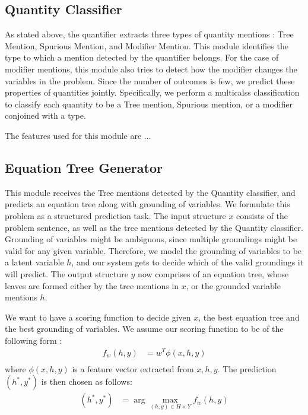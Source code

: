   \subsection{Quantity Classifier}
    As stated above, the quantifier extracts three types of quantity
    mentions : Tree Mention, Spurious Mention, and Modifier
    Mention. This module identifies the type to which a mention
    detected by the quantifier belongs. For the case of modifier
    mentions, this module also tries to detect how the modifier
    changes the variables in the problem. Since the number of outcomes
    is few, we predict these properties of quantities
    jointly. Specifically, we perform a multicalss classification to
    classify each quantity to be a Tree mention, Spurious mention, or
    a modifier conjoined with a type.

    The features used for this module are ...
    
  \subsection{Equation Tree Generator}

    This module receives the Tree mentions detected by the Quantity
    classifier, and predicts an equation tree along with grounding of
    variables. We formulate this problem as a structured prediction
    task.  The input structure $x$ consists of the problem sentence,
    as well as the tree mentions detected by the Quantity
    classifier. Grounding of variables might be ambiguous, since
    multiple groundings might be valid for any given
    variable. Therefore, we model the grounding of variables to be a
    latent variable $h$, and our system gets to decide which of the
    valid groundings it will predict. The output structure $y$ now comprises
    of an equation tree, whose leaves are formed either by the tree mentions
    in $x$, or the grounded variable mentions $h$.

    We want to have a scoring function to decide given $x$, the best
    equation tree and the best grounding of variables. We assume our scoring 
    function to be of the following form : 
    \begin{align*}
      f_w(h, y) &= w^T\phi(x, h, y) \\ 
    \end{align*}  
    where $\phi(x, h, y)$ is a feature vector extracted from $x, h,
    y$. The prediction $(h^*, y^*)$ is then chosen as follows:
    \begin{align*}
      (h^*, y^*) &= \arg\max_{(h, y)\in H \times Y} f_w(h, y)
    \end{align*}

